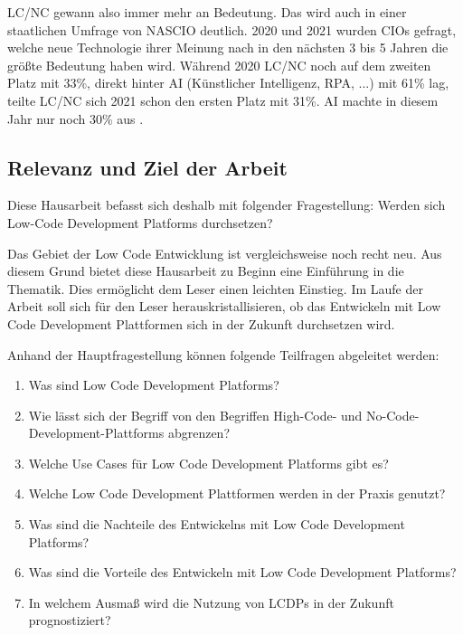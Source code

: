 \documentclass[12pt]{article} %
\begin{document}
	LC/NC gewann also immer mehr an Bedeutung. Das wird auch in einer staatlichen Umfrage von NASCIO deutlich. 2020 und 2021 wurden CIOs gefragt, welche neue Technologie ihrer Meinung nach in den nächsten 3 bis 5 Jahren die größte Bedeutung haben wird. Während 2020 LC/NC noch auf dem zweiten Platz mit 33\%, direkt hinter AI (Künstlicher Intelligenz, RPA, ...) mit 61\% lag, teilte LC/NC sich 2021 schon den ersten Platz mit 31\%. AI machte in diesem Jahr nur noch 30\% aus \cite{AmyGlasscock.2021}.
	
	\subsection{Relevanz und Ziel der Arbeit}	
	Diese Hausarbeit befasst sich deshalb mit folgender Fragestellung:\newline
			Werden sich Low-Code Development Platforms durchsetzen? \newline
			
	Das Gebiet der Low Code Entwicklung ist vergleichsweise noch recht neu. Aus diesem Grund bietet diese Hausarbeit zu Beginn eine Einführung in die Thematik. Dies ermöglicht dem Leser einen leichten Einstieg. Im Laufe der Arbeit soll sich für den Leser herauskristallisieren, ob das Entwickeln mit Low Code Development Plattformen sich in der Zukunft durchsetzen wird. \newline
	
	Anhand der Hauptfragestellung können folgende Teilfragen abgeleitet werden:
	\begin{enumerate}[label=(\roman*)]
		\setlength{\itemsep}{1pt}
		\item Was sind Low Code Development Platforms? 
		\item Wie lässt sich der Begriff von den Begriffen High-Code- und No-Code-Development-Plattforms abgrenzen?
		\item Welche Use Cases für Low Code Development Platforms gibt es? 
		\item Welche Low Code Development Plattformen werden in der Praxis genutzt?
		\item Was sind die Nachteile des Entwickelns mit Low Code Development Platforms? 
		\item Was sind die Vorteile des Entwickeln mit Low Code Development Platforms? 
		\item In welchem Ausmaß wird die Nutzung von LCDPs in der Zukunft prognostiziert?	
	\end{enumerate}
\end{document}
